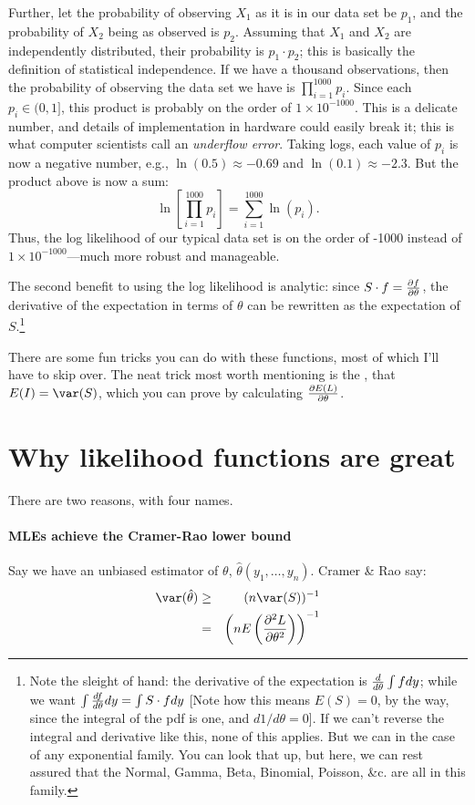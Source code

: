 Further, let the probability of observing $X_1$ as it is in our data
set be $p_1$, and the probability of $X_2$ being as observed is $p_2$.
Assuming that $X_1$ and $X_2$ are independently distributed, their
probability is $p_1\cdot p_2$; this is basically the definition of
statistical independence. If we have a thousand observations, then the
probability of observing the data set we have is $\prod_{i=1}^{1000} p_i$.
Since each $p_i\in (0,1]$, this product is probably on the order of
$1\times 10^{-1000}$. This is a delicate number, and details of
implementation in hardware could easily break it; this is what computer
scientists call an {\sl underflow error}. Taking logs, each value of
$p_i$ is now a negative number, e.g., $\ln(0.5)\approx -0.69$ and $\ln(0.1)\approx -2.3$.
But the product above is now a sum:
$$\ln\left[\prod_{i=1}^{1000} p_i\right] = \sum_{i=1}^{1000} \ln(p_i).$$
Thus, the log likelihood of our typical data set is on the order of
-1000 instead of $1\times 10^{-1000}$---much more robust and manageable.

The second benefit to using the log likelihood is analytic: since $S \cdot f = {\partial f
\over \partial \theta}$, the derivative of the expectation in terms of
$\theta$ can be rewritten as the expectation of $S$.\footnote{%
	Note the sleight of hand: the derivative of the expectation is
	${d\over d\theta}\int f dy$; while we want $\int {d f\over
	d\theta} dy=\int S \cdot f dy$ [Note how this means $E(S)=0$, by the
	way, since the integral of the pdf is one, and $d1/d\theta=0$].
	If we can't reverse the integral and derivative like this, none
	of this applies. But we can in the case of any exponential
	family. You can look that up, but here, we can rest assured that
	the Normal, Gamma, Beta, Binomial, Poisson, \&c. are all in this
	family.} 

There are some fun tricks you can do with these functions, most of which I'll have to
skip over.  The neat trick most worth mentioning is the , that
$E(I)=\var(S)$, which you can prove by calculating ${\partial E(L)\over
\partial \theta}$.

\section{Why likelihood functions are great} There are two reasons, with four names.

\paragraph{MLEs achieve the Cramer-Rao lower bound} 
        		\label{cr} 
Say we have an unbiased estimator of $\theta$,
$\hat\theta(y_1,\dots,y_n)$. Cramer \& Rao say:
\begin{eqnarray}
\var(\hat\theta)&\geq&(n \var(S))^{-1}		\nonumber\\
		&=&\left(nE\left({\partial^2 L\over \partial
\theta^2}\right)\right)^{-1}			\label{CRLB}
\nonumber\end{eqnarray}

